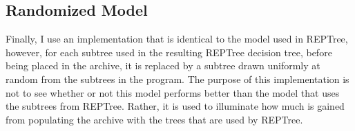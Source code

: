 \subsection{Randomized Model}
Finally, I use an implementation that is identical to the model used in REPTree, however, for each subtree used in the resulting REPTree decision tree, before being placed in the archive, it is replaced by a subtree drawn uniformly at random from the subtrees in the program.  The purpose of this implementation is not to see whether or not this model performs better than the model that uses the subtrees from REPTree.  Rather, it is used to illuminate how much is gained from populating the archive with the trees that are used by REPTree.
